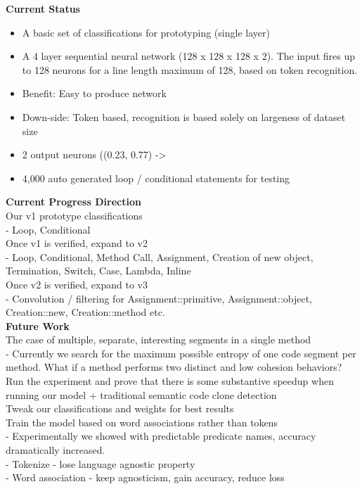 \documentclass{article}
\begin{document}
    \textbf{Current Status}
    \begin{itemize}
        \item A basic set of classifications for prototyping (single layer)
        \item A 4 layer sequential neural network (128 x 128 x 128 x 2). The input fires up to 128 neurons for a line length maximum of 128, based on token recognition.
        \item Benefit: Easy to produce network
        \item Down-side: Token based, recognition is based solely on largeness of dataset size
        \item 2 output neurons ((0.23, 0.77) -> %
        \item 4,000 auto generated loop / conditional statements for testing
    \end{itemize}

    \textbf{Current Progress Direction} \\
    Our v1 prototype classifications\\
    - Loop, Conditional\\
    Once v1 is verified, expand to v2\\
    - Loop, Conditional, Method Call, Assignment, Creation of new object, Termination, Switch, Case, Lambda, Inline\\
    Once v2 is verified, expand to v3\\
    - Convolution / filtering for Assignment::primitive, Assignment::object, Creation::new, Creation::method etc.\\

    \textbf{Future Work}\\
    The case of multiple, separate, interesting segments in a single method\\
    - Currently we search for the maximum possible entropy of one code segment per method. What if a method performs two distinct and low cohesion behaviors?\\
    Run the experiment and prove that there is some substantive speedup when running our model + traditional semantic code clone detection\\
    Tweak our classifications and weights for best results\\
    Train the model based on word associations rather than tokens\\
    - Experimentally we showed with predictable predicate names, accuracy dramatically increased.\\
    - Tokenize - lose language agnostic property\\
    - Word association - keep agnosticism, gain accuracy, reduce loss\\
\end{document}
